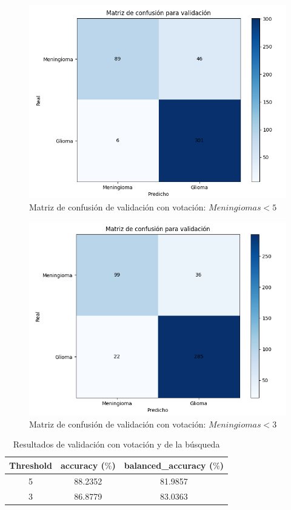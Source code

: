 \begin{figure}[H]
	\centering
	\includegraphics[width=0.7\linewidth]{imagenes/task1_val_5.png}
	\caption{Matriz de confusión de validación con votación: $Meningiomas < 5$}
\end{figure}

\begin{figure}[H]
	\centering
	\includegraphics[width=0.7\linewidth]{imagenes/task1_val_3.png}
	\caption{Matriz de confusión de validación con votación: $Meningiomas < 3$}
\end{figure}

\begin{table}[H]
	\centering
	\begin{tabular}{|ccc|}
		\toprule
		Threshold & accuracy ($\%$) & balanced\_accuracy ($\%$) \\
		\midrule
		5 & 88.2352 & 81.9857 \\ 
		3 & 86.8779 & 83.0363  \\ 
		\bottomrule
	\end{tabular}
	\caption{Resultados de validación con votación y de la búsqueda}
	\label{tabla:resultados11}
\end{table}

